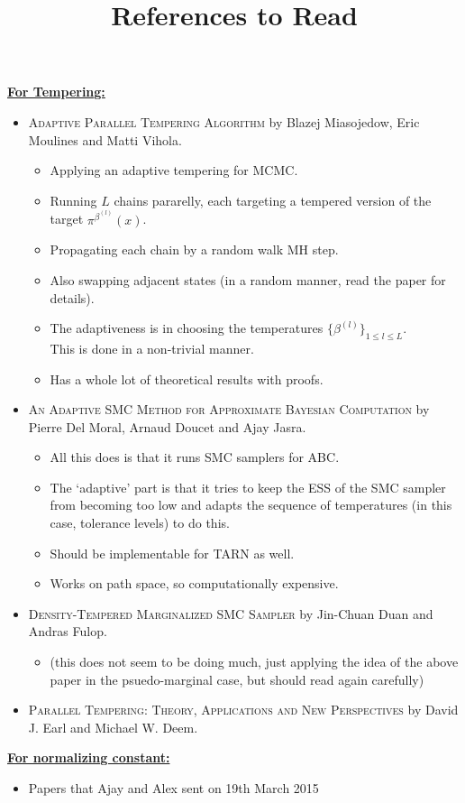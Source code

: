 \documentclass{article}
\begin{document}
\title{References to Read}
\maketitle

\textbf{\underline{For Tempering:}}

\begin{itemize}

\item \textsc{Adaptive Parallel Tempering Algorithm} by Blazej Miasojedow, Eric Moulines and Matti Vihola.
\begin{itemize}
\item Applying an adaptive tempering for MCMC.
\item Running $L$ chains pararelly, each targeting a tempered version of the target $\pi^{\beta^{(l)}}(x)$.
\item Propagating each chain by a random walk MH step.
\item Also swapping adjacent states (in a random manner, read the paper for details).
\item The adaptiveness is in choosing the temperatures $\{\beta^{(l)} \}_{1 \leq l \leq L}$.
\\ This is done in a non-trivial manner.
\item Has a whole lot of theoretical results with proofs.
\end{itemize}  
\item \textsc{An Adaptive SMC Method for Approximate Bayesian Computation} by Pierre Del Moral, Arnaud Doucet and Ajay Jasra. 
\begin{itemize}
\item All this does is that it runs SMC samplers for ABC. 
\item The `adaptive' part is that it tries to keep the ESS of the SMC sampler from becoming too low and adapts the sequence of temperatures (in this case, tolerance levels) to do this. 
\item Should be implementable for TARN as well.
\item Works on path space, so computationally expensive.
\end{itemize}
\item \textsc{Density-Tempered Marginalized SMC Sampler} by Jin-Chuan Duan and Andras Fulop.
\begin{itemize}
\item (this does not seem to be doing much, just applying the idea of the above paper in the psuedo-marginal case, but should read again carefully)
\end{itemize}
\item \textsc{Parallel Tempering: Theory, Applications and New Perspectives} by David J. Earl and Michael W. Deem.

\end{itemize}

\vspace{0.2in}

\textbf{\underline{For normalizing constant:}}

\begin{itemize}

\item Papers that Ajay and Alex sent on 19th March 2015

\end{itemize} 
\end{document}
